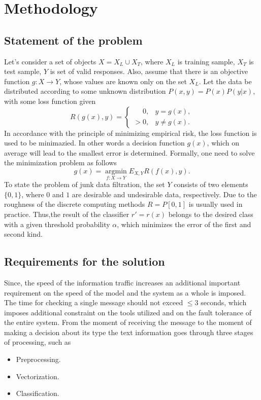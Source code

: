 \documentclass[12pt]{jpconf}
\begin{document}
\section{Methodology}
\subsection{Statement of the problem}
Let's consider a set of objects $ X = X_L \cup X_T$, where
$X_L$ is training sample,
$X_T$ is test sample,
$Y$ is set of valid responses. Also, assume that there is an objective function $g: X \rightarrow Y$, whose values are known only on the set $X_L$. Let the data be distributed according to some unknown distribution $P (x,y) = P(x) P (y|x)$, with some loss function given
$$
R(g(x), y) = 
\begin{cases} 
\phantom{>}0, & y = g(x), \\
> 0, & y \neq g(x).
\end{cases}
$$
In accordance with the principle of minimizing empirical risk, the loss function is used to be minimazied. In other words a decision function $g(x)$, which on average will lead to the smallest error is determined. Formally, one need to solve the minimization problem as follows
$$
g(x) = \operatorname*{argmin}_{f: X \rightarrow Y} E_{X,Y} R(f(x), y).
$$
To state the problem of junk data filtration, the set $Y$ consists of two elements $\{0, 1\}$, where $0$ and $1$ are desirable and undesirable data, respectively. Due to the roughness of the discrete computing methods $R = P[0, 1]$ is usually used in practice. Thus,the result of the classifier $r' = r(x)$ belongs to the desired class with a given threshold probability $\alpha$, which minimizes the error of the first and second kind.

\subsection{Requirements for the solution}
Since, the speed of the information traffic increases an additional important requirement on the speed of the model and the system as a whole is imposed. The time for checking a single message should not exceed $\leqslant3$ seconds, which imposes additional constraint on the tools utilized and on the fault tolerance of the entire system.
From the moment of receiving the message to the moment of making a decision about its type the text information goes through three stages of processing, such as
\begin{itemize}
\item Preprocessing.
\item Vectorization.
\item Classification.
\end{itemize}
\end{document}
